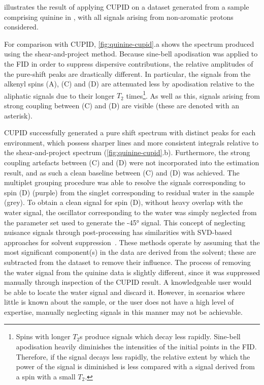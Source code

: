  illustrates the result of applying \ac{CUPID} on
a dataset generated from a sample comprising quinine in ,
with all signals arising from non-aromatic protons considered.

For comparison with \ac{CUPID}, \cref{fig:quinine-cupid}.a shows the
spectrum produced using the shear-and-project method. Because
sine-bell apodisation was applied to the \ac{FID} in order to suppress dispersive
contributions, the relative amplitudes of the pure-shift
peaks are drastically different. In particular, the signals from the alkenyl
spins (A), (C) and (D) are attenuated less by apodisation relative to the
aliphatic signals due to their longer $T_2$ times\footnote{
    Spins with longer $T_2$s produce signals which decay less rapidly.
    Sine-bell apodisation heavily diminishes the intensities of the initial
    points in the \ac{FID}. Therefore, if the signal decays less rapidly, the
    relative extent by which the power of the signal is diminished is less
    compared with a signal derived from a spin with a small $T_2$.
}. As well as this, signals arising from strong coupling between (C) and
(D) are visible (these are denoted with an asterisk).

\ac{CUPID} successfully generated a pure shift spectrum with distinct peaks for
each  environment, which possess sharper lines and more consistent
integrals relative to the shear-and-project spectrum (\cref{fig:quinine-cupid}.b).
Furthermore, the strong coupling artefacts between (C) and (D) were not
incorporated into the estimation result, and as such a clean baseline
between (C) and (D) was achieved.
The multiplet grouping procedure was able to resolve
the signals corresponding to spin (D) (purple) from the singlet corresponding
to residual water in the sample (grey).
To obtain a clean signal for spin (D), without heavy overlap with the water
signal, the oscillator corresponding to the water was simply neglected from
the parameter set used to generate the \ang{-45} signal. This concept of
neglecting nuisance signals through post-processing has similarities with
\ac{SVD}-based approaches for solvent suppression~\cite{Zhu1997}.
These methods operate by assuming that the most significant component(s) in the
data are derived from the solvent; these are subtracted from the dataset to
remove their influence. The process of removing the water signal from the quinine
data is slightly different, since it was suppressed manually through
inspection of the \ac{CUPID} result. A knowledgeable user would be able to
locate the water signal and discard it. However, in scenarios where little is
known about the sample, or the user does not have a high level of expertise,
manually neglecting signals in this manner may not be achievable.

